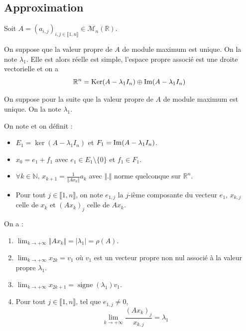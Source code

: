   \subsection{Approximation}

  Soit $A = (a_{i,j})_{i, j \in \llbracket 1, n \rrbracket} \in \mathcal{M}_n(\mathbb{R})$.


  \begin{theorem}
    On suppose que la valeur propre de $A$ de module maximum est unique. On la note $\lambda_1$. Elle est alors réelle est simple, l'espace propre associé est une droite vectorielle et on a
    \[ \mathbb{R}^n = \mathrm{Ker}(A-\lambda_1 I_n) \oplus \mathrm{Im}(A-\lambda_1 I_n) \]
  \end{theorem}

  On suppose pour la suite que la valeur propre de $A$ de module maximum est unique. On la note $\lambda_1$.

  \begin{notation}
    On note et on définit :
    \begin{itemize}
      \item $E_1 = \ker(A-\lambda_1 I_n)$ et $F_1 = \mathrm{Im}(A-\lambda_1 I_n)$.
      \item $x_0 = e_1 + f_1$ avec $e_1 \in E_1 \setminus \{ 0 \}$ et $f_1 \in F_1$.
      \item $\forall k \in \mathbb{N}, \, x_{k+1} = \frac{1}{\Vert A x_k \Vert} a_k$ avec $\Vert . \Vert$ norme quelconque sur $\mathbb{R}^n$.
      \item Pour tout $j \in \llbracket 1,n \rrbracket$, on note $e_{1,j}$ la $j$-ième composante du vecteur $e_1$, $x_{k,j}$ celle de $x_k$ et $(Ax_k)_j$ celle de $Ax_k$.
    \end{itemize}
  \end{notation}

  \begin{theorem}
    On a :
    \begin{enumerate}[label={\bfseries(\roman*)}]
      \item $\lim_{k \rightarrow +\infty} \Vert A x_k \Vert = \vert \lambda_1 \vert = \rho(A)$.
      \item $\lim_{k \rightarrow +\infty} x_{2k} = v_1$ où $v_1$ est un vecteur propre non nul associé à la valeur propre $\lambda_1$.
      \item $\lim_{k \rightarrow +\infty} x_{2k+1} = \operatorname{signe}(\lambda_1) v_1$.
      \item Pour tout $j \in \llbracket 1,n \rrbracket$, tel que $e_{1,j} \neq 0$,
      \[ \lim_{k \rightarrow +\infty} \frac{(A x_k)_j}{x_{k,j}} = \lambda_1 \]
    \end{enumerate}
  \end{theorem}

